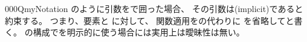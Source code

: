 \documentclass[index]{subfiles}
\begin{document}
\begin{myBlock}{000Q}{myNotation}
  のように引数をで囲った場合、
  その引数は(implicit)であると約束する。
  つまり、要素と
  に対して、
  関数適用をの代わりに
  を省略してと書く。
  の構成でを明示的に使う場合には実用上は曖昧性は無い。
\end{myBlock}
\end{document}
